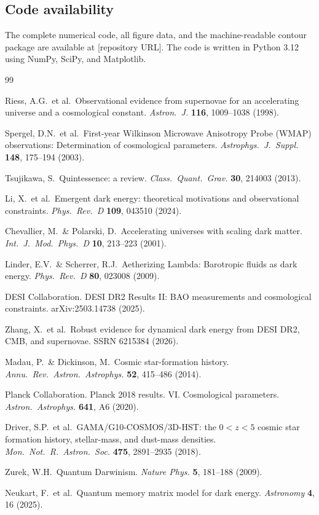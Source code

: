 \documentclass[12pt,a4paper]{article}
\begin{document}
\subsection{Code availability}

The complete numerical code, all figure data, and the machine-readable contour package are available at [repository URL]. The code is written in Python 3.12 using NumPy, SciPy, and Matplotlib.

\begin{thebibliography}{99}

Riess, A.G.\ et al.\ Observational evidence from supernovae for an accelerating universe and a cosmological constant. {\it Astron.\ J.} {\bf 116}, 1009--1038 (1998).

Spergel, D.N.\ et al.\ First-year Wilkinson Microwave Anisotropy Probe (WMAP) observations: Determination of cosmological parameters. {\it Astrophys.\ J.\ Suppl.} {\bf 148}, 175--194 (2003).

Tsujikawa, S.\ Quintessence: a review. {\it Class.\ Quant.\ Grav.} {\bf 30}, 214003 (2013).

Li, X.\ et al.\ Emergent dark energy: theoretical motivations and observational constraints. {\it Phys.\ Rev.\ D} {\bf 109}, 043510 (2024).

Chevallier, M.\ \& Polarski, D.\ Accelerating universes with scaling dark matter. {\it Int.\ J.\ Mod.\ Phys.\ D} {\bf 10}, 213--223 (2001).

Linder, E.V.\ \& Scherrer, R.J.\ Aetherizing Lambda: Barotropic fluids as dark energy. {\it Phys.\ Rev.\ D} {\bf 80}, 023008 (2009).

DESI Collaboration. DESI DR2 Results II: BAO measurements and cosmological constraints. arXiv:2503.14738 (2025).

Zhang, X.\ et al.\ Robust evidence for dynamical dark energy from DESI DR2, CMB, and supernovae. SSRN 6215384 (2026).

Madau, P.\ \& Dickinson, M.\ Cosmic star-formation history. {\it Annu.\ Rev.\ Astron.\ Astrophys.} {\bf 52}, 415--486 (2014).

Planck Collaboration. Planck 2018 results. VI. Cosmological parameters. {\it Astron.\ Astrophys.} {\bf 641}, A6 (2020).

Driver, S.P.\ et al.\ GAMA/G10-COSMOS/3D-HST: the $0<z<5$ cosmic star formation history, stellar-mass, and dust-mass densities. {\it Mon.\ Not.\ R.\ Astron.\ Soc.} {\bf 475}, 2891--2935 (2018).

Zurek, W.H.\ Quantum Darwinism. {\it Nature Phys.} {\bf 5}, 181--188 (2009).

Neukart, F.\ et al.\ Quantum memory matrix model for dark energy. {\it Astronomy} {\bf 4}, 16 (2025).

\end{thebibliography}
\end{document}
